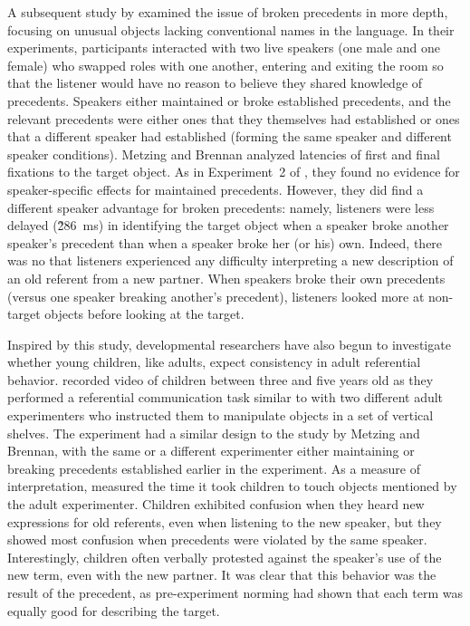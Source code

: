 \documentclass[doc,fignum,apacite,floatsintext]{apa6}
\begin{document}
A subsequent study by  examined the issue of broken precedents in more depth, focusing on unusual objects lacking conventional names in the language.  In their experiments, participants interacted with two live speakers (one male and one female) who swapped roles with one another, entering and exiting the room so that the listener would have no reason to believe they shared knowledge of precedents.  Speakers either maintained or broke established precedents, and the relevant precedents were either ones that they themselves had established or ones that a different speaker had established (forming the same speaker and different speaker conditions).  Metzing and Brennan analyzed latencies of first and final fixations to the target object.  As in Experiment~2 of , they found no evidence for speaker-specific effects for maintained precedents.  However, they did find a different speaker advantage for broken precedents: namely, listeners were less delayed (\~286~ms) in identifying the target object when a speaker broke another speaker's precedent than when a speaker broke her (or his) own.  Indeed, there was no that listeners experienced any difficulty interpreting a new description of an old referent from a new partner.  When speakers broke their own precedents (versus one speaker breaking another's precedent), listeners looked more at non-target objects before looking at the target.

Inspired by this study, developmental researchers have also begun to investigate whether young children, like adults, expect consistency in adult referential behavior.   recorded video of children between three and five years old as they performed a referential communication task similar to  with two different adult experimenters who instructed them to manipulate objects in a set of vertical shelves.  The experiment had a similar design to the study by Metzing and Brennan, with the same or a different experimenter either maintaining or breaking precedents established earlier in the experiment.  As a measure of interpretation,  measured the time it took children to touch objects mentioned by the adult experimenter.  Children exhibited confusion when they heard new expressions for old referents, even when listening to the new speaker, but they showed most confusion when precedents were violated by the same speaker.  Interestingly, children often verbally protested against the speaker's use of the new term, even with the new partner.  It was clear that this behavior was the result of the precedent, as pre-experiment norming had shown that each term was equally good for describing the target.
\end{document}

